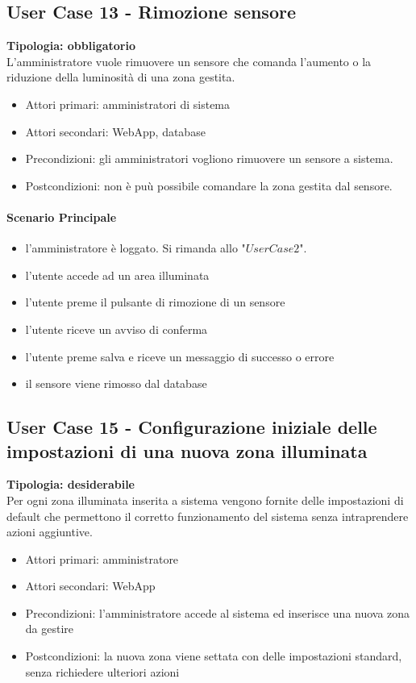 \documentclass[12pt]{article}
\begin{document}
\subsection{User Case 13 - Rimozione sensore}
\textbf{Tipologia: obbligatorio}\\
L'amministratore vuole rimuovere un sensore che comanda l'aumento o la riduzione della luminosità di una zona gestita.
\begin{itemize}
	\item Attori primari: amministratori di sistema
	\item Attori secondari: WebApp, database
	\item Precondizioni: gli amministratori vogliono rimuovere un sensore a sistema.\\
	\item Postcondizioni: non è puù possibile comandare la zona gestita dal sensore.
\end{itemize}
\paragraph{Scenario Principale}
\begin{itemize}
	\item l'amministratore è loggato. Si rimanda allo "$User Case 2$".
	\item l'utente accede ad un area illuminata
	\item l'utente preme il pulsante di rimozione di un sensore
	\item l'utente riceve un avviso di conferma
	\item l'utente preme salva e riceve un messaggio di successo o errore
	\item il sensore viene rimosso dal database
\end{itemize}

\subsection{User Case 15 - Configurazione iniziale delle impostazioni di una nuova zona illuminata}
\textbf{Tipologia: desiderabile} \\
Per ogni zona illuminata inserita a sistema vengono fornite delle impostazioni di default che permettono il corretto funzionamento del sistema senza intraprendere azioni aggiuntive.
\begin{itemize}
	\item Attori primari: amministratore
	\item Attori secondari: WebApp
	\item Precondizioni: l'amministratore accede al sistema ed inserisce una nuova zona da gestire
	\item Postcondizioni: la nuova zona viene settata con delle impostazioni standard, senza richiedere ulteriori azioni
\end{itemize}
\end{document}

